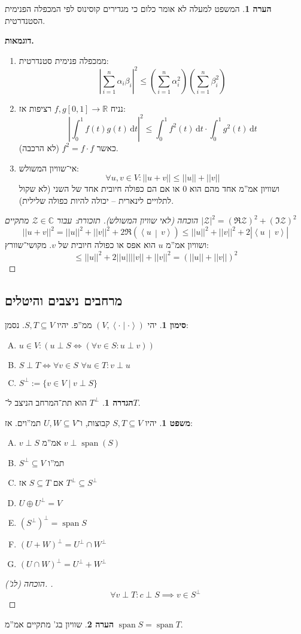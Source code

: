 \documentclass[a4paper]{article}
\newcommand\R     {\mathbb{R}}
\newcommand\C     {\mathbb{C}}
\newcommand\zc    {\mathcal{Z}}
\newcommand\ra    {\rangle}
\newcommand\la    {\langle}
\newcommand\dt    {\,\mathrm{d}t}
\DeclareMathOperator{\Sp}      {span}
\newcommand\co        {\colon}
\newcommand\norm[1]   {\left \vert \left \vert #1 \right \vert \right \vert}
\newcommand\smut      {\left \la \cdot \mid \cdot \right \ra}
\newcommand\mut [2]   {\left \la #1 \,\middle\vert\, #2 \right \ra}
\newcommand\ag        {\alpha}
\newcommand\bg        {\beta}
\newcommand\sof[1]    {\left | #1 \right |}
\newcommand\cl [1]    {\left ( #1 \right )}
\theoremstyle{definition}
\newtheorem{Theorem}{\color{myblue}משפט}
\newtheorem{Definition}{\color{mygreen}הגדרה}
\newtheorem{Remark}{\color{mycyan}הערה}
\newtheorem{Notion}{\color{myred}סימון}
\newcommand\theo  [1] {\begin{Theorem}#1\end{Theorem}}
\newcommand\defi  [1] {\begin{Definition}#1\end{Definition}}
\newcommand\rmark [1] {\begin{Remark}#1\end{Remark}}
\newcommand\noti  [1] {\begin{Notion}#1\end{Notion}}
\begin{document}
	\rmark{המשפט למעלה לא אומר כלום כי מגדירים קוסינוס לפי המכפלה הפנימית הסטנדרטית. }
	
	\textbf{דוגמאות. }
	\begin{enumerate}
		\item ממכפלה פנימית סטנדרטית: 
		\[ \sof{\sum_{i = 1}^{n}\ag_i \bg_i}^2 \le \cl{\sum_{i = 1}^{n}\ag_i^2} \cl{\sum_{i = 1}^{n}\bg_i^2} \]
		\item  נניח $f, g [0, 1] \to \R$ רציפות אז: 
		\[ \sof{\int^1_0 f(t)g(t) \dt}^2 \le \int_{0}^{1}f^2(t) \dt \cdot\int^1_0 g^2(t) \dt \]
		כאשר $f^2 = f \cdot f$ (לא הרכבה). 
		\item אי־שוויון המשולש: 
		\[ \forall u, v \in V \co \norm{u + v} \le \norm{u} + \norm{v} \]
		ושוויון אמ''מ אחד מהם הוא $0$ או אם הם כפולה חיובית אחד של השני (לא שקול לתלויים לינארית – יכולה להיות כפולה שלילית). 
	\end{enumerate}
	\begin{proof}[הוכחה (לאי שוויון המשולש)]
		\textit{תזכורת: עבור $\zc \in \C$ מתקיים $\sof{\zc}^2 = (\Re \zc)^2 + (\Im \zc)^2$}
		\[ \norm{u + v}^2 = \norm{u}^2 + \norm{v}^2 + 2\Re(\mut{u}{v}) \le \norm{u}^2 + \norm{v}^2 + 2\sof{\mut{u}{v}}  \]
		ושוויון אמ''מ $u$ הוא אפס או כפולה חיובית של $v$. מקושי־שוורץ: 
		\[ \le \norm{u}^2 + 2\norm{u}\norm{v} + \norm{v}^2 = \cl{\norm{u} + \norm{v}}^2 \]
	\end{proof}
	
	\subsection{מרחבים ניצבים והיטלים}
	\noti{יהי $(V, \smut)$ ממ''פ. יהיו $S, T \subseteq V$. נסמן: 
		\begin{enumerate}[A.]
			\item \hfil $u \in V \co \cl{u \perp S \iff (\forall v \in S\co u \perp v)}$
			\item \hfil $S \perp T \iff \forall v \in S \,\, \forall u \in T \co v \perp u$ 
			\item \hfil $S^{\perp} := \{v \in V \mid v \perp S\}$
	\end{enumerate}}
	\defi{$T^{\perp}$ הוא תת־המרחב הניצב ל־$T$. }
	\theo{יהיו $S, T \subseteq V$ קבוצות, ו־$U, W \subseteq V$ תמ''וים. אז: 
		\begin{enumerate}[A.]
			\item $v \perp S$ אמ''מ $v \perp \Sp(S)$
			\item $S^{\perp} \subseteq V$ תמ''ו
			\item אם $S \subseteq T$ אז $T^\perp \subseteq S^\perp$
			\item \hfil $U \oplus U^{\perp} = V$
			\item \hfil $\cl{S^\perp}^\perp = \Sp S$
			\item \hfil $(U + W)^{\perp} = U^{\perp} \cap W^{\perp}$
			\item \hfil $(U \cap W)^{\perp} = U^{\perp} + W^{\perp}$
	\end{enumerate}}
	\begin{proof}[הוכחה (לג'). ]
		\[ \forall v \perp T \co c \perp S \implies v \in S^{\perp} \]
	\end{proof}
	\rmark{שוויון בג' מתקיים אמ''מ $\Sp S = \Sp T$. }
	
\end{document}
